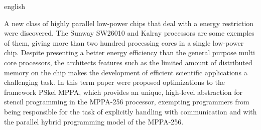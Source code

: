 \begin{otherlanguage*}{english}
\begin{resumo}[Abstract]

  A new class of highly parallel low-power chips that deal with a energy restriction were discovered. The Sunway SW26010 and Kalray processors are some exemples of them, giving more than two hundred processing cores in a single low-power chip. Despite presenting a better energy efficiency than the general purpose multi core processors, the architects features such as the limited amount of distributed memory on the chip makes the development of efficient scientific applications a challenging task. In this term paper were proposed optimizations to the framework PSkel MPPA, which provides an unique, high-level abstraction for stencil programming in the MPPA-256 processor, exempting programmers from being responsible for the task of explicitly handling with communication and with the parallel hybrid programming model of the MPPA-256.


\end{resumo}
\end{otherlanguage*}











